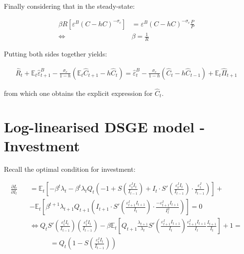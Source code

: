 \documentclass{pracamgr}
\numberwithin{equation}{section}
\begin{document}
Finally considering that in the steady-state:

\begin{align}
\beta R \left[ \varepsilon^{B} \left( C - h C  \right)^{-\sigma_{c}} \right] &= \varepsilon^{B} \left( C - h C  \right)^{-\sigma_{c}} \frac{P}{P} \nonumber \\
\iff & \beta = \frac{1}{R}
\end{align}

Putting both sides together yields:

\begin{align}
\hat{R}_{t} + \mathbb{E}_{t} \hat{\varepsilon}^{B}_{t+1} - \frac{\sigma_{c}}{1-h} \left( \mathbb{E}_{t}\hat{C}_{t+1} - h \hat{C}_{t} \right) = \hat{\varepsilon}^{B}_{t} - \frac{\sigma_{c}}{1-h} \left( \hat{C}_{t} - h \hat{C}_{t-1} \right) + \mathbb{E}_{t} \hat{\Pi}_{t+1}
\end{align}

from which one obtains the explicit expression for $\hat{C}_{t}$.

\section*{Log-linearised DSGE model - Investment}

Recall the optimal condition for investment:

\begin{align}
\frac{\partial L}{\partial I_{t}} &= \mathbb{E}_{t} \left[ -\beta^{t} \lambda_{t} - \beta^{t} \lambda_{t} Q_{t} \left(-1 + S\left(\frac{\varepsilon_{t}^{I}I_{t}}{I_{t-1}} \right) + I_{t} \cdot S' \left(\frac{\varepsilon_{t}^{I}I_{t}}{I_{t-1}} \right) \cdot \frac{\varepsilon_{t}^{I}}{I_{t-1}} \right) \right] + \nonumber \\
\qquad &- \mathbb{E}_{t} \left[ \beta^{t+1} \lambda_{t+1} Q_{t+1} \left(I_{t+1} \cdot S' \left(\frac{\varepsilon_{t+1}^{I}I_{t+1}}{I_{t}} \right) \cdot \frac{-\varepsilon_{t+1}^{I}I_{t+1}}{I_{t}^{2}} \right) \right] = 0 \nonumber \\
& \iff Q_{t}S' \left(\frac{\varepsilon_{t}^{I}I_{t}}{I_{t-1}} \right) \left( \frac{\varepsilon_{t}^{I}I_{t}}{I_{t-1}} \right) - \beta \mathbb{E}_{t} \left[ Q_{t+1} \frac{\lambda_{t+1}}{\lambda_{t}} S' \left(\frac{\varepsilon_{t+1}^{I}I_{t+1}}{I_{t}} \right) \frac{\varepsilon_{t+1}^{I}I_{t+1}}{I_{t}}  \frac{I_{t+1}}{I_{t}} \right] + 1 = \nonumber \\
& \qquad \quad = Q_{t} \left( 1 - S \left(\frac{\varepsilon_{t}^{I}I_{t}}{I_{t-1}} \right) \right)
\end{align}
\end{document}
